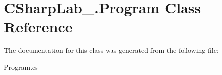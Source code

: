 \hypertarget{class_c_sharp_lab__1_1_1_program}{}\section{C\+Sharp\+Lab\+\_.\+Program Class Reference}
\label{class_c_sharp_lab__1_1_1_program}


The documentation for this class was generated from the following file\+:\begin{DoxyCompactItemize}
\item 
Program.\+cs\end{DoxyCompactItemize}
